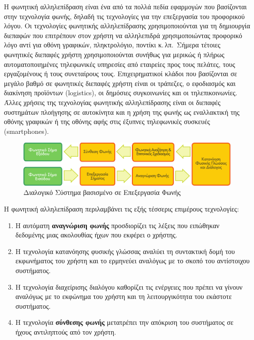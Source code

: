 \documentclass[]{../../metanetpaper}
\begin{document}
\begin{multicols}{2}
Η φωνητική αλληλεπίδραση είναι ένα από τα πολλά πεδία εφαρμογών που βασίζονται στην τεχνολογία φωνής, δηλαδή τις τεχνολογίες για την επεξεργασία του προφορικού λόγου. Οι τεχνολογίες φωνητικής αλληλεπίδρασης χρησιμοποιούνται για τη δημιουργία διεπαφών που επιτρέπουν στον χρήστη να αλληλεπιδρά χρησιμοποιώντας προφορικό λόγο αντί για οθόνη γραφικών, πληκτρολόγιο, ποντίκι κ.\,λπ.~Σήμερα τέτοιες φωνητικές διεπαφές χρήστη χρησιμοποιούνται συνήθως για μερικώς ή πλήρως αυτοματοποιημένες τηλεφωνικές υπηρεσίες από εταιρείες προς τους πελάτες, τους εργαζομένους ή τους συνεταίρους τους. Επιχειρηματικοί κλάδοι που βασίζονται σε μεγάλο βαθμό σε φωνητικές διεπαφές χρήστη είναι οι τράπεζες, ο εφοδιασμός και διακίνηση προϊόντων (logistics), οι δημόσιες συγκοινωνίες και οι τηλεπικοινωνίες. Άλλες χρήσεις της τεχνολογίας φωνητικής αλληλεπίδρασης είναι οι διεπαφές συστημάτων πλοήγησης σε αυτοκίνητα και η χρήση της φωνής ως εναλλακτική της οθόνης γραφικών ή της οθόνης αφής στις έξυπνες τηλεφωνικές συσκευές (smartphones).

\begin{figure}[htb]
  \center  \includegraphics[width=\textwidth]{../_media/greek/simple_speech-based_dialogue_architecture}
  \center
  \caption{Διαλογικό Σύστημα βασισμένο σε Επεξεργασία Φωνής}
  \label{fig:dialoguearch_de}
\end{figure}

Η φωνητική αλληλεπίδραση περιλαμβάνει τις εξής τέσσερις επιμέρους τεχνολογίες:

\begin{enumerate}
\item Η αυτόματη \textbf{αναγνώριση φωνής} προσδιορίζει τις λέξεις που ειπώθηκαν δεδομένης μιας ακολουθίας ήχων που εκφέρει ο χρήστης.
\item Η τεχνολογία κατανόησης φυσικής γλώσσας αναλύει τη συντακτική δομή του εκφωνήματος του χρήστη και το ερμηνεύει αναλόγως με το σκοπό του αντίστοιχου συστήματος.
\item Η τεχνολογία διαχείρισης διαλόγου καθορίζει τις ενέργειες που πρέπει να γίνουν αναλόγως με το εκφώνημα του χρήστη και τη λειτουργικότητα του εκάστοτε συστήματος.    
\item Η τεχνολογία \textbf{σύνθεσης φωνής} μετατρέπει την απόκριση του συστήματος σε ήχους αντιληπτούς από τον χρήστη.
\end{enumerate}


\end{multicols}
\end{document}
